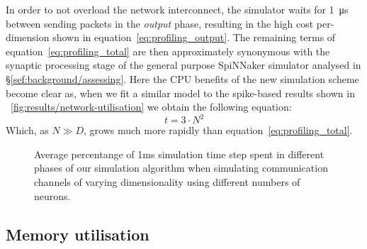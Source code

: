 \documentclass[conference]{IEEEtran}
\begin{document}
In order to not overload the network interconnect, the simulator waits for \SI{1}{\micro\second} between sending packets in the \textit{output} phase, resulting in the high cost per-dimension shown in equation~\ref{eq:profiling_output}. 
The remaining terms of equation~\ref{eq:profiling_total} are then approximately synonymous with the synaptic processing stage of the general purpose SpiNNaker simulator analysed in \S\ref{sef:background/assessing}.
Here the CPU benefits of the new simulation scheme become clear as, when we fit a similar model to the spike-based results shown in \figurename~\ref{fig:results/network-utilisation} we obtain the following equation:
%
\begin{equation}
  t = 3 \cdot N^{2}
\end{equation}
%
Which, as $N \gg D$, grows much more rapidly than equation~\ref{eq:profiling_total}.

  \begin{figure}[!t]
    \centering
    \hfil
    \caption{Average percentange of 1ms simulation time step spent in different phases of our simulation algorithm when simulating communication channels of varying dimensionality using different numbers of neurons.}
    \label{fig:results/comm-channel-cpu}
  \end{figure}

  \subsection{Memory utilisation}
\end{document}
